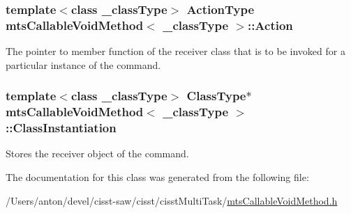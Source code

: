 \subsubsection[{Action}]{\setlength{\rightskip}{0pt plus 5cm}template$<$class \+\_\+class\+Type$>$ {\bf Action\+Type} {\bf mts\+Callable\+Void\+Method}$<$ \+\_\+class\+Type $>$\+::Action\hspace{0.3cm}{\ttfamily [protected]}}\label{classmts_callable_void_method_a120365b9d9e484ec6c6d8dd4b5259abd}
The pointer to member function of the receiver class that is to be invoked for a particular instance of the command. \hypertarget{classmts_callable_void_method_a51691984cb4776eeb1e7871df86b463e}{}
\subsubsection[{Class\+Instantiation}]{\setlength{\rightskip}{0pt plus 5cm}template$<$class \+\_\+class\+Type$>$ {\bf Class\+Type}$\ast$ {\bf mts\+Callable\+Void\+Method}$<$ \+\_\+class\+Type $>$\+::Class\+Instantiation\hspace{0.3cm}{\ttfamily [protected]}}\label{classmts_callable_void_method_a51691984cb4776eeb1e7871df86b463e}
Stores the receiver object of the command. 

The documentation for this class was generated from the following file\+:\begin{DoxyCompactItemize}
\item 
/\+Users/anton/devel/cisst-\/saw/cisst/cisst\+Multi\+Task/\hyperlink{mts_callable_void_method_8h}{mts\+Callable\+Void\+Method.\+h}\end{DoxyCompactItemize}
